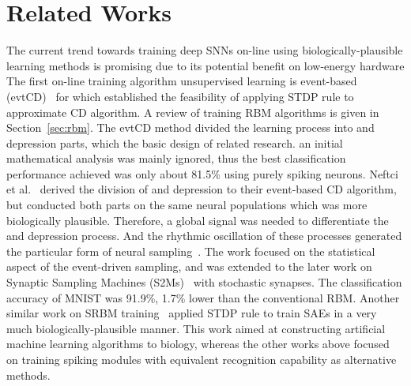\section{Related Works}
\protect\TLSins{\label{sec:SRM_related}}
The current trend towards training deep SNNs on-line using biologically-plausible learning methods is promising due to its potential benefit on low-energy hardware \protect{} \protect{}
The first on-line training algorithm \protect{} \protect{} unsupervised learning is event-based \protect{} \protect{} (evtCD)~\citep{neil2013online} for \protect{} \protect{} which established the feasibility of applying \protect{} STDP rule to \protect{} approximate CD algorithm.
A review of training \protect{} RBM algorithms is given in Section~\ref{sec:rbm}.
The evtCD method divided the learning process into \protect{} \protect{} and depression parts, which \protect{} \protect{} the basic design of related research.
\protect{}
\protect{} an initial \protect{} \protect{} mathematical analysis was mainly ignored, thus the best classification performance achieved was only about 81.5\% using purely spiking neurons.
Neftci et al.~\citep{neftci2013event} derived the division of \protect{} \protect{} and depression to their event-based CD algorithm, but conducted both parts on the same neural populations which was more biologically plausible.
Therefore, a global signal was needed to differentiate the \protect{} \protect{} and depression process.
And the rhythmic oscillation of these processes generated the particular form of neural sampling~\citep{petrovici2013stochastic}.
The work focused on the statistical aspect of the event-driven sampling, and was extended to the later work on Synaptic Sampling Machines (S2Ms)~\citep{neftci2016stochastic} with stochastic synapses.
The classification accuracy of MNIST was 91.9\%, 1.7\% lower than the conventional RBM.
Another similar work on SRBM training~\citep{burbank2015mirrored} applied \protect{} STDP rule to train SAEs in a very much biologically-plausible manner.
This work aimed at constructing artificial machine learning algorithms \protect{} \protect{} to biology, whereas the other works above focused on training spiking \protect{} \protect{} modules with equivalent recognition capability as alternative \protect{} \protect{} methods.


